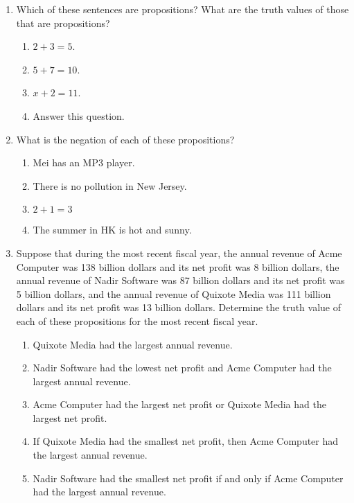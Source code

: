 \documentclass{sig-alternate-05-2015}
\begin{document}
\begin{enumerate}
\item Which of these sentences are propositions? What are the
truth values of those that are propositions?
\begin{enumerate}
	\item $2 + 3 = 5$.
	\item $5 + 7 = 10$.
	\item $x + 2 = 11$.
	\item Answer this question.
\end{enumerate}

\item What is the negation of each of these propositions?
\begin{enumerate}
	\item Mei has an MP3 player.
	\item There is no pollution in New Jersey.
	\item $2 + 1 = 3$
	\item The summer in HK is hot and sunny.
\end{enumerate}

\item Suppose that during the most recent fiscal year, the annual
revenue of Acme Computer was 138 billion dollars
and its net profit was 8 billion dollars, the annual revenue
of Nadir Software was 87 billion dollars and its net profit
was 5 billion dollars, and the annual revenue of Quixote
Media was 111 billion dollars and its net profit was
13 billion dollars. Determine the truth value of each of
these propositions for the most recent fiscal year.
\begin{enumerate}
	\item Quixote Media had the largest annual revenue.
	\item Nadir Software had the lowest net profit and Acme
	Computer had the largest annual revenue.
	\item Acme Computer had the largest net profit or Quixote
	Media had the largest net profit.
	\item If Quixote Media had the smallest net profit, then
	Acme Computer had the largest annual revenue.
	\item Nadir Software had the smallest net profit if and only
	if Acme Computer had the largest annual revenue.
\end{enumerate}


\end{enumerate}
\end{document}
